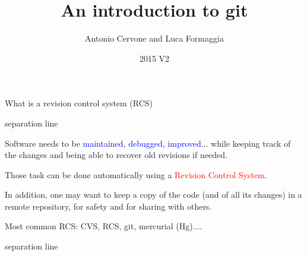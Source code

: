 \documentclass{beamer}
\author{Antonio Cervone and Luca Formaggia}
\title{An introduction to git}
\date{2015 V2}
\newcommand{\titleline}[1][0.025cm]{%
\begin{beamercolorbox}[wd=\paperwidth,ht=#1,center]{separation line}%
\end{beamercolorbox}%
}
\begin{document}
\begin{frame}
\titlepage
\end{frame}
\begin{frame}{What is a revision control system (RCS)}
\titleline
{\small
  Software needs to be \textcolor{blue}{maintained},
 \textcolor{blue}{debugged}, \textcolor{blue}{improved}...
while keeping track of the changes and being able to recover old revisions
if needed.
\smallskip

Those task can be done automatically using a \textcolor{red}{Revision Control System}.
\smallskip

In addition, one may want to keep a copy of the code (and of all its changes) in a remote repository, for safety and for sharing with others.

\smallskip

Most common RCS: CVS, RCS, git, mercurial (Hg)....
}
\titleline
\end{frame}
\end{document}
